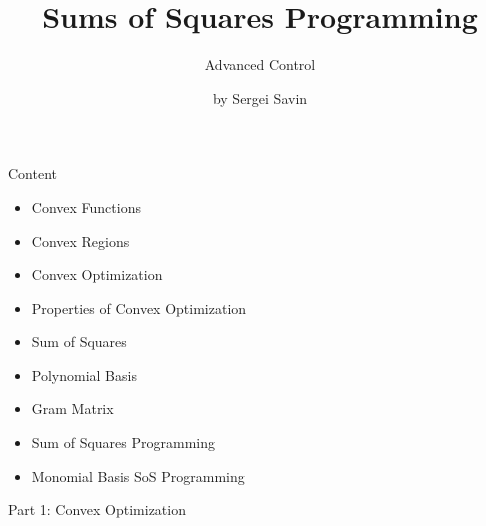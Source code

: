 \documentclass{beamer}
\title{Sums of Squares Programming}
\subtitle{Advanced Control}
\author{by Sergei Savin}
\date{\mydate}
\begin{document}
\maketitle


\begin{frame}{Content}
\begin{itemize}
	\item Convex Functions
	\item Convex Regions
	\item Convex Optimization
	\item Properties of Convex Optimization
	\item Sum of Squares
	\item Polynomial Basis
	\item Gram Matrix
	\item Sum of Squares Programming
	\item Monomial Basis SoS Programming
\end{itemize}
\end{frame}

\begin{frame}
	\begin{center}
		{\Large Part 1: Convex Optimization}
	\end{center}
\end{frame}
\end{document}
